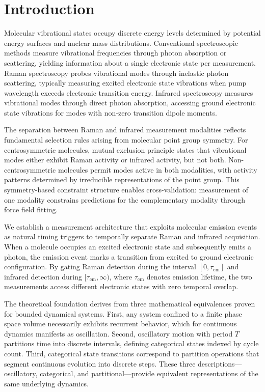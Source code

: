 \documentclass[twocolumn,10pt]{article}
\begin{document}
\section{Introduction}

Molecular vibrational states occupy discrete energy levels determined by potential energy surfaces and nuclear mass distributions. Conventional spectroscopic methods measure vibrational frequencies through photon absorption or scattering, yielding information about a single electronic state per measurement. Raman spectroscopy probes vibrational modes through inelastic photon scattering, typically measuring excited electronic state vibrations when pump wavelength exceeds electronic transition energy. Infrared spectroscopy measures vibrational modes through direct photon absorption, accessing ground electronic state vibrations for modes with non-zero transition dipole moments.

The separation between Raman and infrared measurement modalities reflects fundamental selection rules arising from molecular point group symmetry. For centrosymmetric molecules, mutual exclusion principle states that vibrational modes either exhibit Raman activity or infrared activity, but not both. Non-centrosymmetric molecules permit modes active in both modalities, with activity patterns determined by irreducible representations of the point group. This symmetry-based constraint structure enables cross-validation: measurement of one modality constrains predictions for the complementary modality through force field fitting.

We establish a measurement architecture that exploits molecular emission events as natural timing triggers to temporally separate Raman and infrared acquisition. When a molecule occupies an excited electronic state and subsequently emits a photon, the emission event marks a transition from excited to ground electronic configuration. By gating Raman detection during the interval $[0, \tau_{\text{em}}]$ and infrared detection during $[\tau_{\text{em}}, \infty)$, where $\tau_{\text{em}}$ denotes emission lifetime, the two measurements access different electronic states with zero temporal overlap.

The theoretical foundation derives from three mathematical equivalences proven for bounded dynamical systems. First, any system confined to a finite phase space volume necessarily exhibits recurrent behavior, which for continuous dynamics manifests as oscillation. Second, oscillatory motion with period $T$ partitions time into discrete intervals, defining categorical states indexed by cycle count. Third, categorical state transitions correspond to partition operations that segment continuous evolution into discrete steps. These three descriptions---oscillatory, categorical, and partitional---provide equivalent representations of the same underlying dynamics.
\end{document}
